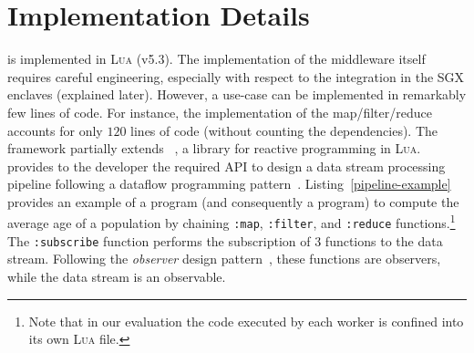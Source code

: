 \section{Implementation Details}\label{sec:implementation}
\SYS{} is implemented in \textsc{Lua} (v5.3).
The implementation of the middleware itself requires careful engineering, especially with respect to the integration in the SGX enclaves (explained later).
However, a \SYS{} use-case can be implemented in remarkably few lines of code. 
For instance, the implementation of the map/filter/reduce accounts for only $120$ lines of code (without counting the dependencies).
The framework partially extends \rxl~\cite{github:rxlua}, a library for reactive programming in \textsc{Lua}.
\rxl provides to the developer the required API to design a data stream processing pipeline following a dataflow programming pattern~\cite{uustalu_essence_2005}.
% 
Listing~\ref{pipeline-example} provides an example of a \rxl program (and consequently a \SYS{} program) to compute the average age of a population by chaining \texttt{:map}, \texttt{:filter}, and \texttt{:reduce} functions.\footnote{Note that in our evaluation the code executed by each worker is confined into its own \textsc{Lua} file.}
The \texttt{:subscribe} function performs the subscription of 3 functions to the data stream.
Following the \emph{observer} design pattern~\cite{szallies_using_1997}, these functions are observers, while the data stream is an observable.
% 
